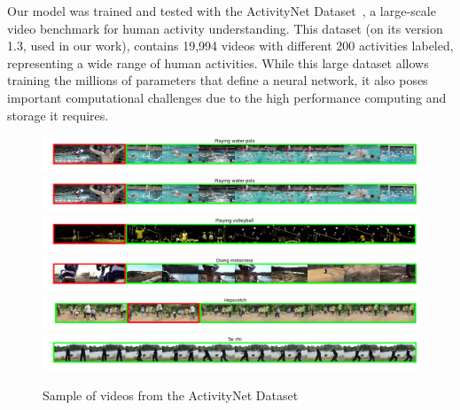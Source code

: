 Our model was trained and tested with the ActivityNet Dataset~\cite{caba2015activitynet}, a large-scale video benchmark for human activity understanding. This dataset (on its version 1.3, used in our work), contains 19,994 videos with different 200 activities labeled, representing a wide range of human activities. While this large dataset allows training the millions of parameters that define a neural network, it also poses important computational challenges due to the high performance computing and storage it requires.

\begin{figure}[t]
\begin{center}
\includegraphics[width=1\linewidth]{img/methodology/activitynet_examples/activitynet_example_1}
\includegraphics[width=1\linewidth]{img/methodology/activitynet_examples/activitynet_example_2}
\includegraphics[width=1\linewidth]{img/methodology/activitynet_examples/activitynet_example_3}
\includegraphics[width=1\linewidth]{img/methodology/activitynet_examples/activitynet_example_4}
\includegraphics[width=1\linewidth]{img/methodology/activitynet_examples/activitynet_example_5}
\includegraphics[width=1\linewidth]{img/methodology/activitynet_examples/activitynet_example_6}
\end{center}
\caption{Sample of videos from the ActivityNet Dataset}
\label{fig:dataset_example}
\end{figure}

